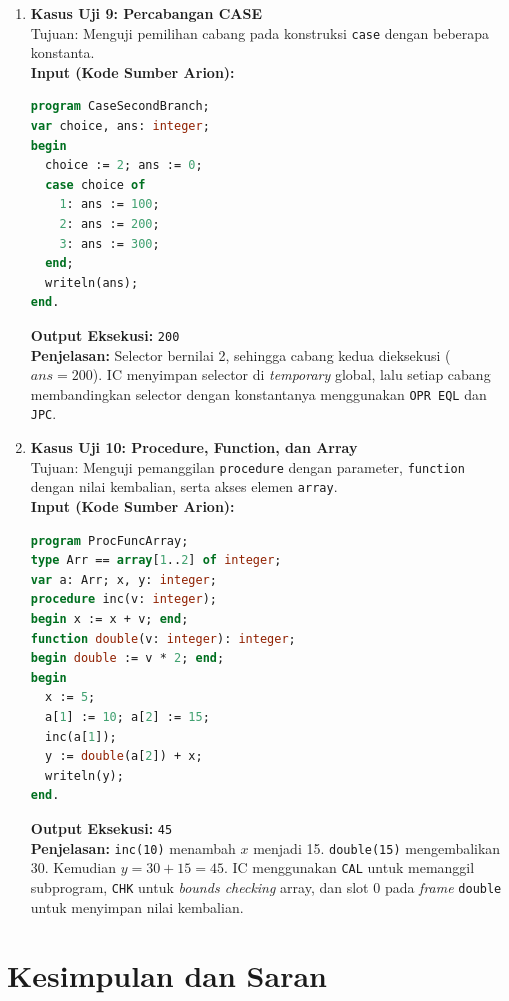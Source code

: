 \documentclass[12pt, a4paper]{article}
\begin{document}
\begin{enumerate}
    \item \textbf{Kasus Uji 9: Percabangan CASE} \\
    Tujuan: Menguji pemilihan cabang pada konstruksi \texttt{case} dengan beberapa konstanta. \\
    \vspace{0.2cm}
    \textbf{Input (Kode Sumber Arion):}
\begin{lstlisting}[language=Pascal]
program CaseSecondBranch;
var choice, ans: integer;
begin
  choice := 2; ans := 0;
  case choice of
    1: ans := 100;
    2: ans := 200;
    3: ans := 300;
  end;
  writeln(ans);
end.
\end{lstlisting}
    \textbf{Output Eksekusi:} \texttt{200} \\
    \textbf{Penjelasan:} Selector bernilai 2, sehingga cabang kedua dieksekusi ($ans = 200$). IC menyimpan selector di \textit{temporary} global, lalu setiap cabang membandingkan selector dengan konstantanya menggunakan \texttt{OPR EQL} dan \texttt{JPC}.
    \vspace{0.5cm}

    \item \textbf{Kasus Uji 10: Procedure, Function, dan Array} \\
    Tujuan: Menguji pemanggilan \texttt{procedure} dengan parameter, \texttt{function} dengan nilai kembalian, serta akses elemen \texttt{array}. \\
    \vspace{0.2cm}
    \textbf{Input (Kode Sumber Arion):}
\begin{lstlisting}[language=Pascal]
program ProcFuncArray;
type Arr == array[1..2] of integer;
var a: Arr; x, y: integer;
procedure inc(v: integer);
begin x := x + v; end;
function double(v: integer): integer;
begin double := v * 2; end;
begin
  x := 5;
  a[1] := 10; a[2] := 15;
  inc(a[1]);
  y := double(a[2]) + x;
  writeln(y);
end.
\end{lstlisting}
    \textbf{Output Eksekusi:} \texttt{45} \\
    \textbf{Penjelasan:} \texttt{inc(10)} menambah $x$ menjadi 15. \texttt{double(15)} mengembalikan 30. Kemudian $y = 30 + 15 = 45$. IC menggunakan \texttt{CAL} untuk memanggil subprogram, \texttt{CHK} untuk \textit{bounds checking} array, dan slot 0 pada \textit{frame} \texttt{double} untuk menyimpan nilai kembalian.

\end{enumerate}

\section{Kesimpulan dan Saran}
\end{document}
